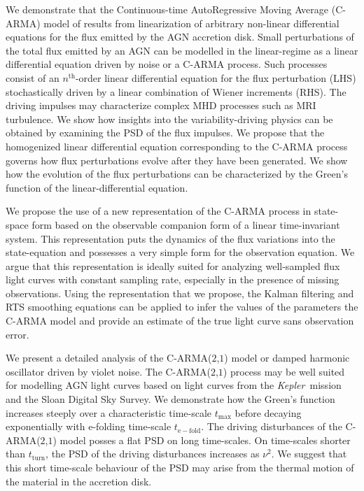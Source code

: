 \documentclass[a4paper,fleqn,usenatbib]{mnras}
\newcommand{\Kepler}{\textit{Kepler~}}
\begin{document}
We demonstrate that the Continuous-time AutoRegressive Moving Average (C-ARMA) model of \citet{Kelly14} results from linearization of arbitrary non-linear differential equations for the flux emitted by the AGN accretion disk. Small perturbations of the total flux emitted by an AGN can be modelled in the linear-regime as a linear differential equation driven by noise or a C-ARMA process. Such processes consist of an $n^{\mathrm{th}}$-order linear differential equation for the flux perturbation (LHS) stochastically driven by a linear combination of Wiener increments (RHS). The driving impulses may characterize complex MHD processes such as MRI turbulence. We show how insights into the variability-driving physics can be obtained by examining the PSD of the flux impulses. We propose that the homogenized linear differential equation corresponding to the C-ARMA process governs how flux perturbations evolve after they have been generated. We show how the evolution of the flux perturbations can be characterized by the Green's function of the linear-differential equation.

We propose the use of a new representation of the C-ARMA process in state-space form based on the observable companion form of a linear time-invariant system. This representation puts the dynamics of the flux variations into the state-equation and possesses a very simple form for the observation equation. We argue that this representation is ideally suited for analyzing well-sampled flux light curves with constant sampling rate, especially in the presence of missing observations. Using the representation that we propose, the Kalman filtering and RTS smoothing equations can be applied to infer the values of the parameters the C-ARMA model and provide an estimate of the true light curve sans observation error. 

We present a detailed analysis of the C-ARMA($2$,$1$) model or damped harmonic oscillator driven by violet noise. The C-ARMA($2$,$1$) process may be well suited for modelling AGN light curves based on light curves from the \Kepler mission and the Sloan Digital Sky Survey. We demonstrate how the Green's function increases steeply over a characteristic time-scale $t_{\mathrm{max}}$ before decaying exponentially with e-folding time-scale $t_{\mathrm{e-fold}}$. The driving disturbances of the C-ARMA($2$,$1$) model posses a flat PSD on long time-scales. On time-scales shorter than $t_{\mathrm{turn}}$, the PSD of the driving disturbances increases as $\nu^{2}$. We suggest that this short time-scale behaviour of the PSD may arise from the thermal motion of the material in the accretion disk.
\end{document}
